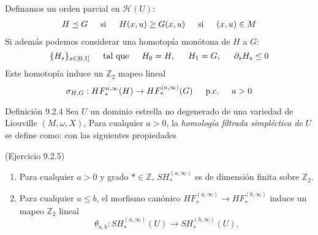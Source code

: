 \documentclass{beamer}
\newcounter{Ejercicio}
\begin{document}
\begin{frame}
\begin{block}{}
\end{block}
Definamos un orden parcial en $\mathcal{H}(U)$:
\begin{gather*}
H\preceq G\hspace{1.5em}\mbox{si}\hspace{1.5em}H(x,u)\geq G(x,u)\hspace{1.5em}\mbox{si}\hspace{1.5em} (x,u)\in M
\end{gather*}
Si adem\'as podemos considerar una homotop\'ia mon\'otona de $H$ a $G$: $$\{H_s\}_{s\in[0,1]}\hspace{1.5em}\mbox{tal que}\hspace{1.5em}H_0=H,\hspace{1.5em} H_1=G,\hspace{1.5em}\partial_sH_s\leq 0$$
Este homotop\'ia induce un $\mathbb{Z}_2$ mapeo lineal $$\sigma_{H,G}:HF_{\ast}^{a,\infty}(H)\rightarrow HF_{\ast}^{(a,\infty)}(G)\hspace{1.5em} \mbox{p.c.}\hspace{1.5em} a>0 $$
\end{frame}

\begin{frame}
\begin{block}{Definici\'on 9.2.4}
Sea $U$ un dominio estrella no degenerado de una variedad de Liouville $(M,\omega,X)$, Para cualquier $a>0$, la \emph{homolog\'ia filtrada simpl\'ectica de} $U$ se define como:
con las siguientes propiedades
\end{block}
\begin{block}{(Ejercicio 9.2.5)}
\begin{enumerate}
\item Para cualquier $a>0$ y grado $\ast\in\mathbb{Z},\,SH_{\ast}^{(a,\infty)}$ es de dimensi\'on finita sobre $\mathbb{Z}_2$.
\item Para cualquier $a\leq b$, el morfismo can\'onico $HF_{\ast}^{(a,\infty)}\rightarrow HF_{\ast}^{(b,\infty)}$ induce un mapeo $\mathbb{Z}_2$ lineal $$\theta_{a,b}:SH_{\ast}^{(a,\infty)}(U)\rightarrow SH_{\ast}^{(b,\infty)}(U).$$
\end{enumerate}
\end{block}
\end{frame}
\end{document}
